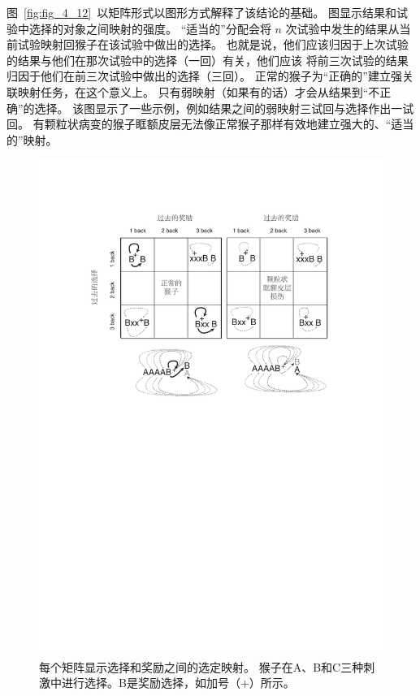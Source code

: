 图~\ref{fig:fig_4_12}~以矩阵形式以图形方式解释了该结论的基础。
图显示结果和试验中选择的对象之间映射的强度。
“适当的”分配会将 $ n $ 次试验中发生的结果从当前试验映射回猴子在该试验中做出的选择。
也就是说，他们应该归因于上次试验的结果与他们在那次试验中的选择（一回）有关，他们应该
将前三次试验的结果归因于他们在前三次试验中做出的选择（三回）。
正常的猴子为“正确的”建立强关联映射任务，在这个意义上。
只有弱映射（如果有的话）才会从结果到“不正确”的选择。
该图显示了一些示例，例如结果之间的弱映射三试回与选择作出一试回。
有颗粒状病变的猴子眶额皮层无法像正常猴子那样有效地建立强大的、“适当的”映射。\par


\begin{figure}[!htb]
	\centering
	\includegraphics{chap4/fig_4_12}
	\caption{每个矩阵显示选择和奖励之间的选定映射。
		猴子在A、B和C三种刺激中进行选择。B是奖励选择，如加号（+）所示。
}
\end{figure}
